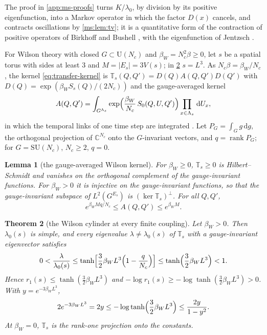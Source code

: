 \documentclass[11pt,a4paper]{amsart}
\newtheorem{theorem}{Theorem}[section]
\newtheorem{lemma}[theorem]{Lemma}
\theoremstyle{definition}
\theoremstyle{remark}
\numberwithin{equation}{section}
\DeclareMathOperator{\rank}{rank}    %
\newcommand{\C}{\mathbb{C}}          %
\newcommand{\abs}[1]{\lvert #1\rvert}      %
\newcommand{\dd}{\,\mathrm{d}}             %
\newcommand{\SU}{\mathrm{SU}}              %
\newcommand{\U}{\mathrm{U}}                %
\newcommand{\TT}{\mathbb{T}}               %
\newcommand{\Vol}[1]{V(#1)}                %
\newcommand{\lzero}{\lambda_0}             %
\newcommand{\betaW}{\beta_{W}}             %
\begin{document}
The proof in \cref{app:ms-proofs} turns $K/\lambda_0$, by division by its positive eigenfunction, into a Markov operator in which the factor $D(x)$ cancels, and contracts oscillations by \cref{ms:lem:tv}; it is a quantitative form of the contraction of positive operators of Birkhoff and Bushell \cite{birkhoff1957,bushell1973}, with the eigenfunction of Jentzsch \cite{jentzsch1912}.

For Wilson theory with closed $G\subset\U(N_c)$ and $\betaW=N_c^2\beta\ge0$, let $s$ be a spatial torus with sides at least $3$ and $M=\abs{E_s}=3\Vol{s}$; in \cref{ms:thm:Wilson-cylinder} $s=L^3$. As $N_c\beta=\betaW/N_c$, the kernel \eqref{eq:transfer-kernel} is $\TT_s(Q,Q')=D(Q)A(Q,Q')D(Q')$ with $D(Q)=\exp(\betaW S_s(Q)/(2N_c))$ and the gauge-averaged kernel
\[
A(Q,Q')=\int_{G^{\Lambda_s}}\exp\Bigl(\frac{\betaW}{N_c}\,S_0(Q,U,Q')\Bigr)\prod_{x\in\Lambda_s}\dd U_x ,
\]
in which the temporal links of one time step are integrated \cite{luscher1977}. Let $P_G=\int_Gg\dd g$, the orthogonal projection of $\C^{N_c}$ onto the $G$-invariant vectors, and $q=\rank P_G$; for $G=\SU(N_c)$, $N_c\ge2$, $q=0$.

\begin{lemma}[the gauge-averaged Wilson kernel]\label{ms:lem:Wilson-positive}
For $\betaW\ge0$, $\TT_s\ge0$ is Hilbert--Schmidt and vanishes on the orthogonal complement of the gauge-invariant functions. For $\betaW>0$ it is injective on the gauge-invariant functions, so that the gauge-invariant subspace of $L^2(G^{E_s})$ is $(\ker\TT_s)^\perp$. For all $Q,Q'$,
\begin{equation}\label{ms:eq:Jensen-bounds}
e^{\betaW Mq/N_c}\le A(Q,Q')\le e^{\betaW M}.
\end{equation}
\end{lemma}

\begin{theorem}[the Wilson cylinder at every finite coupling]\label{ms:thm:Wilson-cylinder}
Let $\betaW>0$. Then $\lzero(s)$ is simple, and every eigenvalue $\lambda\ne\lzero(s)$ of $\TT_s$ with a gauge-invariant eigenvector satisfies
\[
0<\frac{\lambda}{\lzero(s)}\le\tanh\Bigl[\frac32\betaW L^3\Bigl(1-\frac{q}{N_c}\Bigr)\Bigr]\le\tanh\Bigl(\frac32\betaW L^3\Bigr)<1 .
\]
Hence $r_1(s)\le\tanh(\frac32\betaW L^3)$ and $-\log r_1(s)\ge-\log\tanh(\frac32\betaW L^3)>0$. With $y=e^{-3\betaW L^3}$,
\begin{equation}\label{ms:eq:finite-degeneration}
2e^{-3\betaW L^3}=2y\le-\log\tanh\Bigl(\frac32\betaW L^3\Bigr)\le\frac{2y}{1-y^2}.
\end{equation}
At $\betaW=0$, $\TT_s$ is the rank-one projection onto the constants.
\end{theorem}
\end{document}
